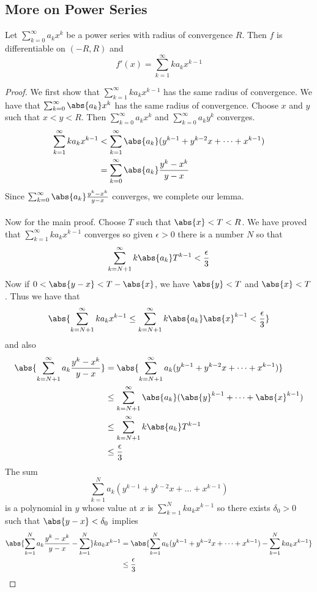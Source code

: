 \subsection{More on Power Series}
\begin{thm}{}{} Let $\sum_{k=0}^\infty a_kx^k$ be a power series with radius of convergence $R$. Then $f$ is differentiable on $(-R,R)$ and $$f'(x)=\sum_{k=1}^\infty ka_kx^{k-1}$$ \tcbline
\begin{proof} We first show that $\sum_{k=1}^\infty ka_kx^{k-1}$ has the same radius of convergence. We have that $\sum_{k=0}^\infty \abs{a_k}x^k$ has the same radius of convergence. Choose $x$ and $y$ such that $x<y<R$. Then $\sum_{k=0}^\infty a_kx^k$ and $\sum_{k=0}^\infty a_ky^k$ converges. 
\begin{align*}
\sum_{k=1}^\infty ka_kx^{k-1}&<\sum_{k=1}^\infty\abs{a_k}(y^{k-1}+y^{k-2}x+\dots+x^{k-1})\\
&=\sum_{k=0}^\infty\abs{a_k}\frac{y^k-x^k}{y-x}
\end{align*}
Since $\sum_{k=0}^\infty\abs{a_k}\frac{y^k-x^k}{y-x}$ converges, we complete our lemma. \\~\\
Now for the main proof. Choose $T$ such that $\abs{x}<T<R$. We have proved that $\sum_{k=1}^\infty ka_kx^{k-1}$ converges so given $\epsilon>0$ there is a number $N$ so that $$\sum_{k=N+1}^\infty k\abs{a_k}T^{k-1}<\frac{\epsilon}{3}$$ Now if $0<\abs{y-x}<T-\abs{x}$, we have $\abs{y}<T$ and $\abs{x}<T$. Thus we have that $$\abs{\sum_{k=N+1}^\infty ka_kx^{k-1}\leq\sum_{k=N+1}^\infty k\abs{a_k}\abs{x}^{k-1}<\frac{\epsilon}{3}}$$ and also
\begin{align*}
\abs{\sum_{k=N+1}^\infty a_k\frac{y^k-x^k}{y-x}}&=\abs{\sum_{k=N+1}^\infty a_k(y^{k-1}+y^{k-2}x+\dots+x^{k-1})}\\
&\leq\sum_{k=N+1}^\infty\abs{a_k}(\abs{y}^{k-1}+\dots+\abs{x}^{k-1})\\
&\leq\sum_{k=N+1}^\infty k\abs{a_k}T^{k-1}\\
&\leq\frac{\epsilon}{3}
\end{align*} The sum $$\sum_{k=1}^Na_k(y^{k-1}+y^{k-2}x+\dots+x^{k-1})$$ is a polynomial in $y$ whose value at $x$ is $\sum_{k=1}^Nka_kx^{k-1}$ so there exists $\delta_0>0$ such that $\abs{y-x}<\delta_0$ implies 
\begin{align*}
\abs{\sum_{k=1}^Na_k\frac{y^k-x^k}{y-x}-\sum_{k=1}^N}ka_kx^{k-1}&=\abs{\sum_{k=1}^Na_k(y^{k-1}+y^{k-2}x+\dots+x^{k-1})-\sum_{k=1}^Nka_kx^{k-1}}\\
&\leq\frac{\epsilon}{3}

\end{align*}
\end{proof}
\end{thm}

